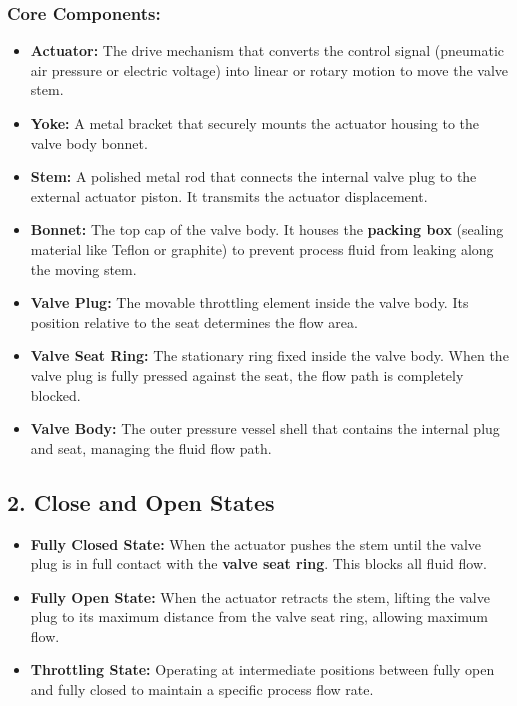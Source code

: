 \subsubsection{Core Components:}
\begin{itemize}
  \item \textbf{Actuator:} The drive mechanism that converts the control signal (pneumatic air pressure or electric voltage) into linear or rotary motion to move the valve stem.
  \item \textbf{Yoke:} A metal bracket that securely mounts the actuator housing to the valve body bonnet.
  \item \textbf{Stem:} A polished metal rod that connects the internal valve plug to the external actuator piston. It transmits the actuator displacement.
  \item \textbf{Bonnet:} The top cap of the valve body. It houses the \textbf{packing box} (sealing material like Teflon or graphite) to prevent process fluid from leaking along the moving stem.
  \item \textbf{Valve Plug:} The movable throttling element inside the valve body. Its position relative to the seat determines the flow area.
  \item \textbf{Valve Seat Ring:} The stationary ring fixed inside the valve body. When the valve plug is fully pressed against the seat, the flow path is completely blocked.
  \item \textbf{Valve Body:} The outer pressure vessel shell that contains the internal plug and seat, managing the fluid flow path.
\end{itemize}


\subsection{2. Close and Open States}
\begin{itemize}
  \item \textbf{Fully Closed State:} When the actuator pushes the stem until the valve plug is in full contact with the \textbf{valve seat ring}. This blocks all fluid flow.
  \item \textbf{Fully Open State:} When the actuator retracts the stem, lifting the valve plug to its maximum distance from the valve seat ring, allowing maximum flow.
  \item \textbf{Throttling State:} Operating at intermediate positions between fully open and fully closed to maintain a specific process flow rate.
\end{itemize}


